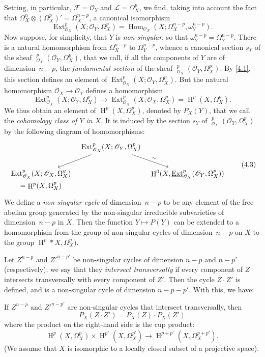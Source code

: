 \documentclass{article}
\theoremstyle{plain}
\newenvironment{theorem}[1]
    {\renewcommand\theinnercustomtheorem{#1}\innercustomtheorem}
    {\endinnercustomtheorem}
\theoremstyle{definition}
\newcommand{\sh}{\mathscr}
\DeclareMathOperator{\Ext}{Ext}
\DeclareMathOperator{\Hom}{Hom}
\DeclareMathOperator{\shExt}{\underline{Ext}}
\DeclareMathOperator{\HH}{H}
\newcommand{\oldpage}[1]{\marginpar{\footnotesize$\Big\vert$ \textit{p.~#1}}}
\begin{document}
Setting, in particular, $\sh{F}=\sh{O}_Y$ and $\sh{L}=\Omega_X^p$, we find, taking into account the fact that $\Omega_X^n\otimes(\Omega_X^p)'=\Omega_X^{n-p}$, a canonical isomorphism
\[
\label{4.2}
  \Ext_{\sh{O}_X}^p(X;\sh{O}_Y,\Omega_X^p) = \Hom_{\sh{O}_X}(X;\Omega_X^{n-p},\omega_Y^{n-p}).
\tag{4.2}
\]
Now suppose, for simplicity, that $Y$ is \emph{non-singular}, so that $\omega_Y^{n-p}=\Omega_Y^{n-p}$.
There is a natural homomorphism from $\Omega_X^{n-p}$ to $\Omega_Y^{n-p}$, whence a canonical section $s_Y$ of the sheaf $\shExt_{\sh{O}_X}^p(\sh{O}_Y,\Omega_X^p)$, that we call, if all the components of $Y$ are of dimension~$n-p$, the \emph{fundamental section} of the sheaf $\shExt_{\sh{O}_X}^p(\sh{O}_Y,\Omega_X^p)$.
By \cref{4.1}, this section defines an element of $\Ext_{\sh{O}_X}^p(X;\sh{O}_Y,\Omega_X^p)$.
But the natural homomorphism $\sh{O}_X\to\sh{O}_Y$ defines a homomorphism
\[
  \Ext_{\sh{O}_X}^p(X;\sh{O}_Y,\Omega_X^p) \to \Ext_{\sh{O}_X}^p(X;\sh{O}_X,\Omega_X^p) = \HH^p(X,\Omega_X^p).
\]
We thus obtain an element of $\HH^p(X,\Omega_X^p)$, denoted by $P_X(Y)$, that we call the \emph{cohomology class of $Y$ in $X$}.
It is induced by the section $s_Y$ of $\shExt_{\sh{O}_X}^p(\sh{O}_Y,\Omega_X^p)$ by the following diagram of homomorphisms:
\[
\label{4.3}
  \begin{tikzcd}[column sep=tiny]
    & \Ext_{\sh{O}_X}^p(X;\sh{O}_Y,\Omega_X^p) \ar[dl] \ar[dr,"\sim"]
  \\\Ext_{\sh{O}_X}^p(X;\sh{O}_X,\Omega_X^y) && \HH^0(X,\shExt_{\sh{O}_X}^p(\sh{O}_Y,\Omega_X^p))
  \\[-2em]=\HH^p(X,\Omega_X^p)
  \end{tikzcd}
\tag{4.3}
\]
We define a \emph{non-singular cycle} of dimension~$n-p$ to be any element of the free abelian group generated by the non-singular irreducible subvarieties of dimension~$n-p$ in $X$.
Then the function $Y\mapsto P(Y)$ can be extended to a homomorphism from the group of non-singular cycles of dimension~$n-p$ on $X$ to the group $\HH^p*X,\Omega_X^p)$.

Let $Z^{n-p}$ and $Z'^{n-p'}$ be non-singular cycles of dimension $n-p$ and $n-p'$ (respectively);
we say that they \emph{intersect transversally} if every component of $Z$ intersects transversally with every component of $Z'$.
Then the cycle $Z\cdot Z'$ is defined, and is a non-singular cycle of dimension $n-p-p'$.
With this, we have:

\oldpage{149-11}
\begin{theorem}{1}
\label{theorem1}
  If $Z^{n-p}$ and $Z'^{n-p'}$ are non-singular cycles that intersect transversally, then
  \[
  \label{4.4}
    P_X(Z\cdot Z') = P_X(Z)\cdot P_X(Z')
  \tag{4.4}
  \]
  where the product on the right-hand side is the cup product:
  \[
    \HH^p(X,\Omega_X^p)\times\HH^{p'}(X,\Omega_X^{p'}) \to \HH^{p+p'}(X,\Omega_X^{p+p'}).
  \]
  (We assume that $X$ is isomorphic to a locally closed subset of a projective space).
\end{theorem}
\end{document}
